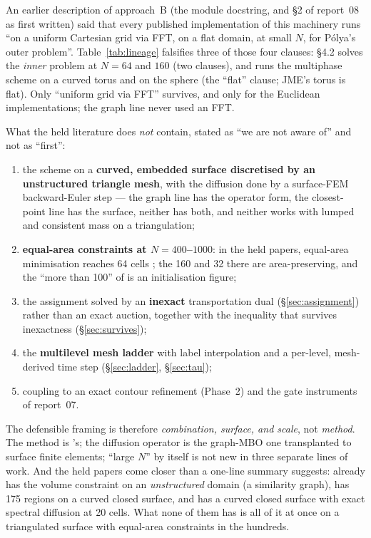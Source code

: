 \documentclass[11pt,a4paper]{article}
\begin{document}
An earlier description of approach~B (the module docstring, and \S2 of
report~08 as first written) said that every published implementation of this
machinery runs ``on a uniform Cartesian grid via FFT, on a flat domain, at small
$N$, for P\'olya's outer problem''. Table~\ref{tab:lineage} falsifies three of
those four clauses: \cite{jacobs2018auction} \S4.2 solves the \emph{inner}
problem at $N = 64$ and $160$ (two clauses), and \cite{merriman2007surfaces}
runs the multiphase scheme on a curved torus and on the sphere (the ``flat''
clause; JME's torus is flat). Only ``uniform grid via FFT'' survives, and only
for the Euclidean implementations; the graph line never used an FFT.

What the held literature does \emph{not} contain, stated as ``we are not aware
of'' and not as ``first'':
\begin{enumerate}[itemsep=1pt]
  \item the scheme on a \textbf{curved, embedded surface discretised by an
    unstructured triangle mesh}, with the diffusion done by a surface-FEM
    backward-Euler step --- the graph line has the operator form, the closest-point
    line has the surface, neither has both, and neither works with lumped and
    consistent mass on a triangulation;
  \item \textbf{equal-area constraints at $N = 400$--$1000$}: in the held
    papers, equal-area minimisation reaches 64 cells
    \cite[\S4.2]{jacobs2018auction}; the 160 and 32 there are area-preserving,
    and the ``more than 100'' of \cite{bogosel2021longest} is an initialisation
    figure;
  \item the assignment solved by an \textbf{inexact} transportation dual
    (\S\ref{sec:assignment}) rather than an exact auction, together with the
    inequality that survives inexactness (\S\ref{sec:survives});
  \item the \textbf{multilevel mesh ladder} with label interpolation and a
    per-level, mesh-derived time step (\S\ref{sec:ladder}, \S\ref{sec:tau});
  \item coupling to an exact contour refinement (Phase~2) and the gate
    instruments of report~07.
\end{enumerate}
The defensible framing is therefore \emph{combination, surface, and scale}, not
\emph{method}. The method is \cite{jacobs2018auction}'s; the diffusion operator
is the graph-MBO one transplanted to surface finite elements; ``large $N$'' by
itself is not new in three separate lines of work. And the held papers come
closer than a one-line summary suggests: \cite[\S5]{jacobs2018auction} already
has the volume constraint on an \emph{unstructured} domain (a similarity graph),
\cite[Fig.~11]{merriman2007surfaces} has 175 regions on a curved closed surface,
and \cite{wang2019dirichlet} has a curved closed surface with exact spectral
diffusion at 20 cells. What none of them has is all of it at once on a
triangulated surface with equal-area constraints in the hundreds.
\end{document}

